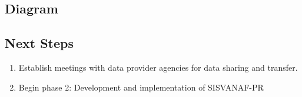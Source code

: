 \documentclass[12pt,letterpaper]{report}
\begin{document}
%	
%
%		
%			
%	

\subsection{Diagram}

% 
% 
% 
 \begin{landscape}
 
 \end{landscape}

\newpage
\subsection{Next Steps}
\begin{enumerate}
   
\item Establish meetings with data provider agencies for data sharing and transfer.
 
\item Begin phase 2: Development and implementation of SISVANAF-PR

\end{enumerate}
\end{document}
